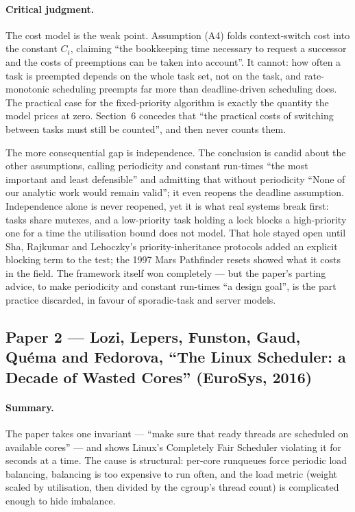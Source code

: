 \paragraph{Critical judgment.}
The cost model is the weak point. Assumption (A4) folds context-switch cost into the
constant $C_i$, claiming ``the bookkeeping time necessary to request a successor and the
costs of preemptions can be taken into account''. It cannot: how often a task is
preempted depends on the whole task set, not on the task, and rate-monotonic scheduling
preempts far more than deadline-driven scheduling does. The practical case for the
fixed-priority algorithm is exactly the quantity the model prices at zero. Section~6
concedes that ``the practical costs of switching between tasks must still be counted'',
and then never counts them.

The more consequential gap is independence. The conclusion is candid about the other
assumptions, calling periodicity and constant run-times ``the most important and least
defensible'' and admitting that without periodicity ``None of our analytic work would
remain valid''; it even reopens the deadline assumption. Independence alone is never
reopened, yet it is what real systems break first: tasks share mutexes, and a
low-priority task holding a lock blocks a high-priority one for a time the utilisation
bound does not model. That hole stayed open until Sha, Rajkumar and Lehoczky's
priority-inheritance protocols added an explicit blocking term to the test; the 1997
Mars Pathfinder resets showed what it costs in the field. The framework itself won
completely --- but the paper's parting advice, to make periodicity and constant
run-times ``a design goal'', is the part practice discarded, in favour of sporadic-task
and server models.

\subsection*{Paper 2 --- Lozi, Lepers, Funston, Gaud, Qu\'ema and Fedorova,
``The Linux Scheduler: a Decade of Wasted Cores'' (EuroSys, 2016)}

\paragraph{Summary.}
The paper takes one invariant --- ``make sure that ready threads are scheduled on
available cores'' --- and shows Linux's Completely Fair Scheduler violating it for
seconds at a time. The cause is structural: per-core runqueues force periodic load
balancing, balancing is too expensive to run often, and the load metric (weight scaled
by utilisation, then divided by the cgroup's thread count) is complicated enough to hide
imbalance.

